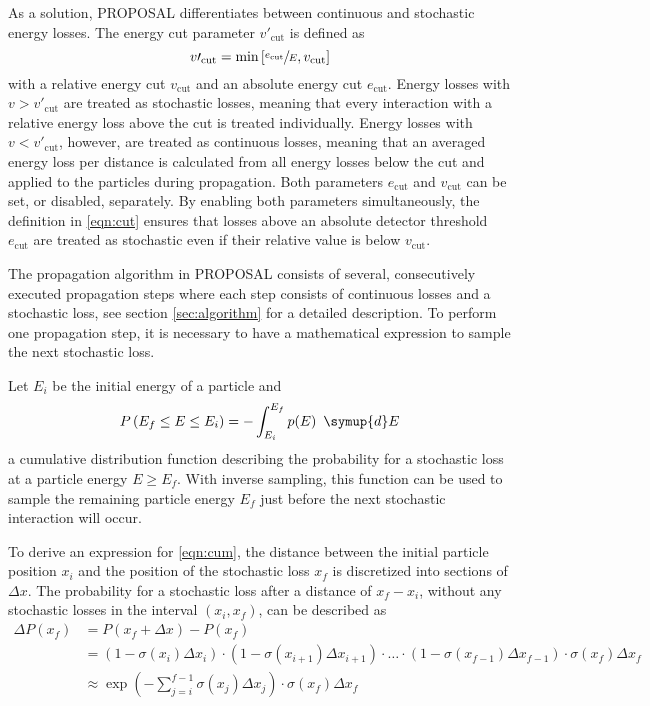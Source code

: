 As a solution, PROPOSAL differentiates between continuous and stochastic energy losses.
The energy cut parameter $v\prime_\text{cut}$ is defined as
%
\begin{equation}
	\label{eqn:cut}
	v\prime_\text{cut} = \text{min}\left[\sfrac{e_\text{cut}}{E}, v_\text{cut} \right]
\end{equation}
%
with a relative energy cut $v_\text{cut}$ and an absolute energy cut $e_\text{cut}$.
Energy losses with $v > v\prime_\text{cut}$ are treated as stochastic losses, meaning that every interaction with a relative energy loss above the cut is treated individually.
Energy losses with $v < v\prime_\text{cut}$, however, are treated as continuous losses, meaning that an averaged energy loss per distance is calculated from all energy losses below the cut and applied to the particles during propagation.
Both parameters $e_{\text{cut}}$ and $v_{\text{cut}}$ can be set, or disabled, separately.
By enabling both parameters simultaneously, the definition in \eqref{eqn:cut} ensures that losses above an absolute detector threshold $e_\text{cut}$ are treated as stochastic even if their relative value is below $v_{\text{cut}}$.

The propagation algorithm in PROPOSAL consists of several, consecutively executed propagation steps where each step consists of continuous losses and a stochastic loss, see section \ref{sec:algorithm} for a detailed description.
To perform one propagation step, it is necessary to have a mathematical expression to sample the next stochastic loss.

Let $E_i$ be the initial energy of a particle and
%
\begin{equation}
	\label{eqn:cum}
	P\left(E_f \leq E \leq E_i\right) = - \int_{E_i}^{E_f} p(E) \, \symup{d}E
\end{equation}
%
a cumulative distribution function describing the probability for a stochastic loss at a particle energy $E \geq E_f$.
With inverse sampling, this function can be used to sample the remaining particle energy $E_f$ just before the next stochastic interaction will occur.

To derive an expression for \eqref{eqn:cum}, the distance between the initial particle position $x_i$ and the position of the stochastic loss $x_f$ is discretized into sections of $\Delta x$.
The probability for a stochastic loss after a distance of $x_f - x_i$, without any stochastic losses in the interval $\left(x_i, x_f\right)$, can be described as
%
\begin{equation}
	\begin{split}
	\Delta P\left(x_f\right) &= P\left( x_f + \Delta x \right) - P\left( x_f \right)\\
	&= \left( 1 - \sigma(x_i) \Delta x_i \right) \cdot \left( 1 - \sigma(x_{i+1}) \Delta x_{i+1} \right) \cdot\ldots\cdot \left( 1 - \sigma(x_{f-1}) \Delta x_{f-1} \right) \cdot \sigma(x_f) \Delta x_f \\
	&\approx \exp \left( - \sum_{j=i}^{f-1} \sigma(x_j) \Delta x_j \right) \cdot \sigma(x_f) \Delta x_f\\
	\end{split}
\end{equation}

